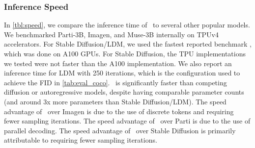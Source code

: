  \subsubsection{Inference Speed}
\label{sec:speed}
In \cref{tbl:speed}, we compare the inference time of \name~to several other popular models. We benchmarked Parti-3B, Imagen, and Muse-3B internally on TPUv4 accelerators. 
For Stable Diffusion/LDM, we used the fastest reported benchmark \cite{sdinference}, which was done on A100 GPUs. For Stable Diffusion, the TPU implementations we tested were not faster than the A100 implementation. We also report an inference time for LDM with 250 iterations, which is the configuration used to achieve the FID in \cref{tab:eval_coco}. \name~is significantly faster than competing diffusion or autoregressive models, despite having comparable parameter counts (and around 3x more parameters than Stable Diffusion/LDM). The speed advantage of \name~over Imagen is due to the use of discrete tokens and requiring fewer sampling iterations. The speed advantage of \name~over Parti is due to the use of parallel decoding. The speed advantage of \name~over Stable Diffusion is primarily attributable to requiring fewer sampling iterations. 
